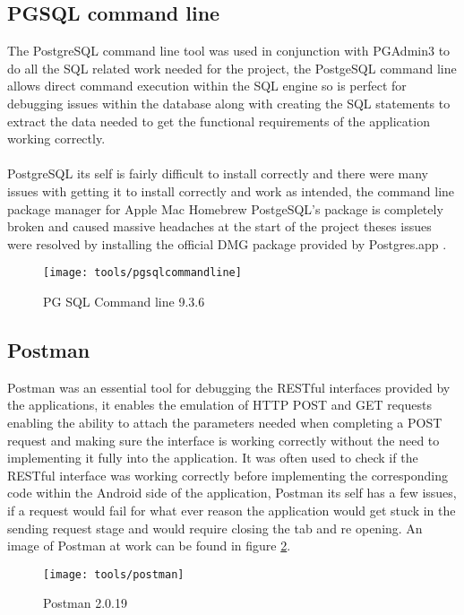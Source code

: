\subsection*{PGSQL command line}

The PostgreSQL command line tool was used in conjunction with PGAdmin3 to do all the SQL related work needed for the project, the PostgeSQL command line allows direct command execution within the SQL engine so is perfect for debugging issues within the database along with creating the SQL statements to extract the data needed to get the functional requirements of the application working correctly.\\
\\
PostgreSQL its self is fairly difficult to install correctly and there were many issues with getting it to install correctly and work as intended, the command line package manager for Apple Mac Homebrew PostgeSQL's package is completely broken and caused massive headaches at the start of the project theses issues were resolved by installing the official DMG package provided by Postgres.app \cite{jemt:postgresapp:2015:online}.

\begin{figure}[H]
    \centering
    \texttt{[image: tools/pgsqlcommandline]}
    \caption{PG SQL Command line 9.3.6}
    \label{fig:pg_sql_image}
\end{figure} 

\subsection*{Postman}

Postman was an essential tool for debugging the RESTful interfaces provided by the applications, it enables the emulation of HTTP POST and GET requests enabling the ability to attach the parameters needed when completing a POST request and making sure the interface is working correctly without the need to implementing it fully into the application. It was often used to check if the RESTful interface was working correctly before implementing the corresponding code within the Android side of the application, Postman its self has a few issues, if a request would fail for what ever reason the application would get stuck in the sending request stage and would require closing the tab and re opening. An image of Postman at work can be found in figure \ref{fig:postman_image}.

\begin{figure}[H]
    \centering
    \texttt{[image: tools/postman]}
    \caption{Postman 2.0.19}
    \label{fig:postman_image}
\end{figure} 


